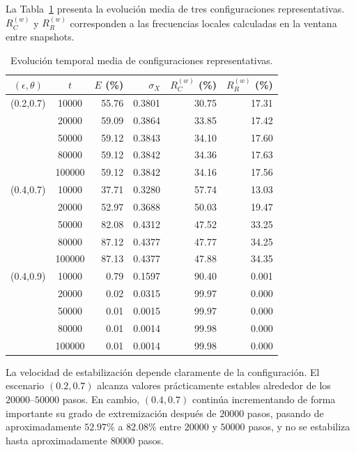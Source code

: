 \documentclass[11pt,a4paper]{article}
\begin{document}
La Tabla~\ref{tab:temporal} presenta la evolución media de tres configuraciones representativas. $R_C^{(w)}$ y $R_R^{(w)}$ corresponden a las frecuencias locales calculadas en la ventana entre snapshots.

\begin{table}[htbp]
\centering
\caption{Evolución temporal media de configuraciones representativas.}
\label{tab:temporal}
\small
\begin{tabular}{ccrrrr}
\toprule
$(\epsilon,\theta)$ & $t$ &
$E$ (\%) &
$\sigma_X$ &
$R_C^{(w)}$ (\%) &
$R_R^{(w)}$ (\%) \\
\midrule
(0.2,0.7) & 10000  & 55.76 & 0.3801 & 30.75 & 17.31 \\
          & 20000  & 59.09 & 0.3864 & 33.85 & 17.42 \\
          & 50000  & 59.12 & 0.3843 & 34.10 & 17.60 \\
          & 80000  & 59.12 & 0.3842 & 34.36 & 17.63 \\
          & 100000 & 59.12 & 0.3842 & 34.16 & 17.56 \\
\midrule
(0.4,0.7) & 10000  & 37.71 & 0.3280 & 57.74 & 13.03 \\
          & 20000  & 52.97 & 0.3688 & 50.03 & 19.47 \\
          & 50000  & 82.08 & 0.4312 & 47.52 & 33.25 \\
          & 80000  & 87.12 & 0.4377 & 47.77 & 34.25 \\
          & 100000 & 87.13 & 0.4377 & 47.88 & 34.35 \\
\midrule
(0.4,0.9) & 10000  & 0.79 & 0.1597 & 90.40 & 0.001 \\
          & 20000  & 0.02 & 0.0315 & 99.97 & 0.000 \\
          & 50000  & 0.01 & 0.0015 & 99.97 & 0.000 \\
          & 80000  & 0.01 & 0.0014 & 99.98 & 0.000 \\
          & 100000 & 0.01 & 0.0014 & 99.98 & 0.000 \\
\bottomrule
\end{tabular}
\end{table}

La velocidad de estabilización depende claramente de la configuración. El escenario $(0.2,0.7)$ alcanza valores prácticamente estables alrededor de los $20000$--$50000$ pasos. En cambio, $(0.4,0.7)$ continúa incrementando de forma importante su grado de extremización después de $20000$ pasos, pasando de aproximadamente $52.97\%$ a $82.08\%$ entre $20000$ y $50000$ pasos, y no se estabiliza hasta aproximadamente $80000$ pasos.
\end{document}
